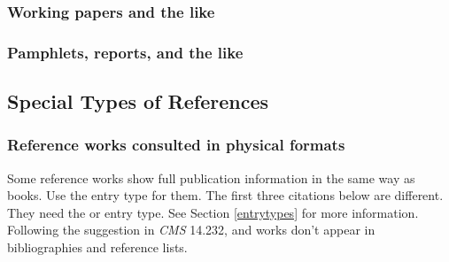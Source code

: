 \documentclass[11pt,letterpaper,oneside]{article}
\begin{document}
\subsubsection{Working papers and the like}

\begin{citebib}
\item \cite{lucki1980}
\end{citebib}

\setcounter{subsubsection}{219}
\subsubsection{Pamphlets, reports, and the like}

\begin{citebib}
\item \cite{lifestyles1996}
\item \cite[¶2,620]{standardtax1996}
\end{citebib}

\setcounter{subsection}{7}
\subsection{Special Types of References}
\setcounter{subsection}{14}

\setcounter{subsubsection}{231}
\subsubsection{Reference works consulted in physical formats}
\label{14.232}

Some reference works show full publication information in the same way
as books. Use the  entry type for them. The first three
citations below are different. They need the  or
 entry type. See Section \ref{entrytypes} for
more information. Following the suggestion in \textit{CMS} 14.232,
 and  works don't appear in
bibliographies and reference lists.

\begin{citebib}
\item \cite{salvation1980}
\item \cite{hootananny2009}
\item \cite{dab1937}
\item \cite[s.vv. \mkbibquote{police ranks}, \mkbibquote{postal addresses}]{timestyle2003}
\item \cite[6.8.2]{mla2008}
\end{citebib}
\end{document}
